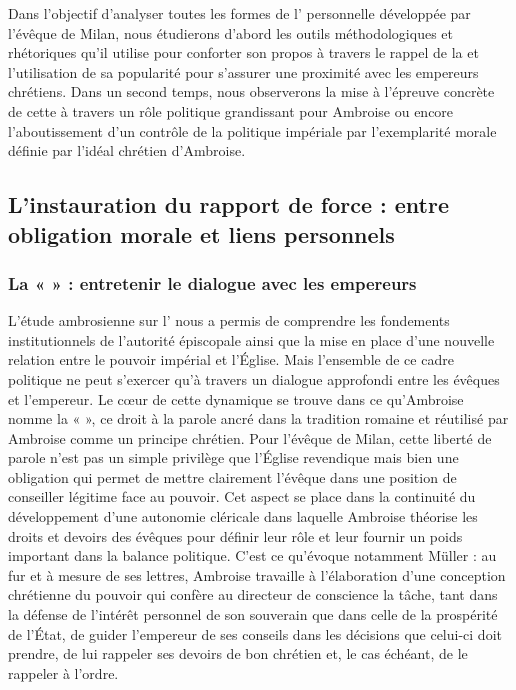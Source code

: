 \bigskip

Dans l'objectif d'analyser toutes les formes de l' personnelle développée par l'évêque de Milan, nous étudierons d'abord les outils méthodologiques et rhétoriques qu'il utilise pour conforter son propos à travers le rappel de la  et l'utilisation de sa popularité pour s'assurer une proximité avec les empereurs chrétiens. Dans un second temps, nous observerons la mise à l'épreuve concrète de cette  à travers un rôle politique grandissant pour Ambroise ou encore l'aboutissement d'un contrôle de la politique impériale par l'exemplarité morale définie par l'idéal chrétien d'Ambroise.

\bigskip

\subsection{L'instauration du rapport de force : entre obligation morale et liens personnels}

\subsubsection{La «  » : entretenir le dialogue avec les empereurs}

L'étude ambrosienne sur l' nous a permis de comprendre les fondements institutionnels de l'autorité épiscopale ainsi que la mise en place d'une nouvelle relation entre le pouvoir impérial et l'Église. Mais l'ensemble de ce cadre politique ne peut s'exercer qu'à travers un dialogue approfondi entre les évêques et l'empereur. Le cœur de cette dynamique se trouve dans ce qu'Ambroise nomme la «  », ce droit à la parole ancré dans la tradition romaine et réutilisé par Ambroise comme un principe chrétien. Pour l'évêque de Milan, cette liberté de parole n'est pas un simple privilège que l'Église revendique mais bien une obligation qui permet de mettre clairement l'évêque dans une position de conseiller légitime face au pouvoir. Cet aspect se place dans la continuité du développement d'une autonomie cléricale dans laquelle Ambroise théorise les droits et devoirs des évêques pour définir leur rôle et leur fournir un poids important dans la balance politique. C'est ce qu'évoque notamment Müller : au fur et à mesure de ses lettres, Ambroise travaille à l’élaboration d’une conception chrétienne du pouvoir qui confère au directeur de conscience la tâche, tant dans la défense de l’intérêt personnel de son souverain que dans celle de la prospérité de l’État, de guider l’empereur de ses conseils dans les décisions que celui-ci doit prendre, de lui rappeler ses devoirs de bon chrétien et, le cas échéant, de le rappeler à l’ordre\autocite[219]{muller_conflits}.

